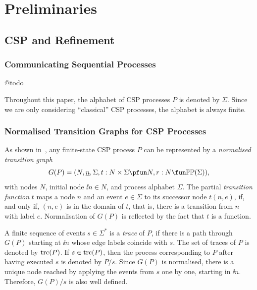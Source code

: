 \section{Preliminaries}
\label{section:preliminaries}


 
\subsection{CSP and Refinement}


\subsubsection*{Communicating Sequential Processes} @todo


Throughout this paper, the alphabet of CSP processes $P$ is denoted by $\Sigma$. 
Since we are only considering ``classical'' CSP processes, the alphabet is always finite.

\subsubsection*{Normalised Transition Graphs for CSP Processes}
\label{sec:ntg}

As shown in~\cite{Roscoe:1994:CME:197600}, any finite-state CSP process $P$
can be represented by a \emph{normalised transition graph}
$$
G(P) = ( N, \ii n, \Sigma, t : N\times\Sigma \pfun N, r : N \fun \mathbb{P}\mathbb{P}(\Sigma)),
$$
with nodes $N$, initial node $\ii n\in N$, and process alphabet $\Sigma$. The
partial \emph{transition function} $t$ maps a node $n$ and an event
$e\in\Sigma$ to its successor node $t(n,e)$, if, and only if, $(n,e)$ is in
the domain of $t$, that is, there is a transition from $n$ with label $e$.
Normalisation of $G(P)$ is reflected by the fact that $t$ is a function.

A finite sequence of events $s\in\Sigma^*$ is a \emph{trace} of $P$, if there
is a path through $G(P)$ starting  at $\ii n$ whose edge labels coincide with
$s$. The set of traces of $P$ is denoted by $\text{trc}(P)$. If $s\in\text{trc}(P)$, then
the process corresponding to $P$ after having executed $s$ is denoted by
$P/s$. Since $G(P)$ is normalised, there is a unique node reached by applying
the events from $s$ one by one, starting in $\ii n$. Therefore, $G(P)/s$  is
also well defined.


